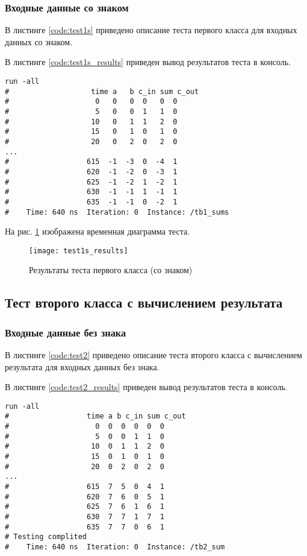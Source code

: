 \subsubsection{Входные данные со знаком}

В листинге \ref{code:test1s} приведено описание теста первого класса для входных данных со знаком.


В листинге \ref{code:test1s_results} приведен вывод результатов теста в консоль.
\begin{lstlisting}[caption=Результаты теста первого класса (со знаком), label=code:test1s_results, style=console]
run -all
# 		            time a   b c_in sum c_out
#                    0   0   0  0   0  0
#                    5   0   0  1   1  0
#                   10   0   1  1   2  0
#                   15   0   1  0   1  0
#                   20   0   2  0   2  0
...
#                  615  -1  -3  0  -4  1
#                  620  -1  -2  0  -3  1
#                  625  -1  -2  1  -2  1
#                  630  -1  -1  1  -1  1
#                  635  -1  -1  0  -2  1
#    Time: 640 ns  Iteration: 0  Instance: /tb1_sums
\end{lstlisting}

На рис. \ref{fig:test1s_results} изображена временная диаграмма теста.
\begin{figure}[H]
	\begin{center}
		\texttt{[image: test1s\_results]}
		\caption{Результаты теста первого класса (со знаком)}
		\label{fig:test1s_results}
	\end{center}
\end{figure}

\subsection{Тест второго класса с вычислением результата}

\subsubsection{Входные данные без знака}

В листинге \ref{code:test2} приведено описание теста второго класса с вычислением результата для входных данных без знака.


В листинге \ref{code:test2_results} приведен вывод результатов теста в консоль.
\begin{lstlisting}[caption=Результаты теста второго класса с вычислением результата (без знака), label=code:test2_results, style=console]
run -all
# 		           time a b c_in sum c_out
#                    0  0  0  0  0  0
#                    5  0  0  1  1  0
#                   10  0  1  1  2  0
#                   15  0  1  0  1  0
#                   20  0  2  0  2  0
...
#                  615  7  5  0  4  1
#                  620  7  6  0  5  1
#                  625  7  6  1  6  1
#                  630  7  7  1  7  1
#                  635  7  7  0  6  1
# Testing complited
#    Time: 640 ns  Iteration: 0  Instance: /tb2_sum
\end{lstlisting}

